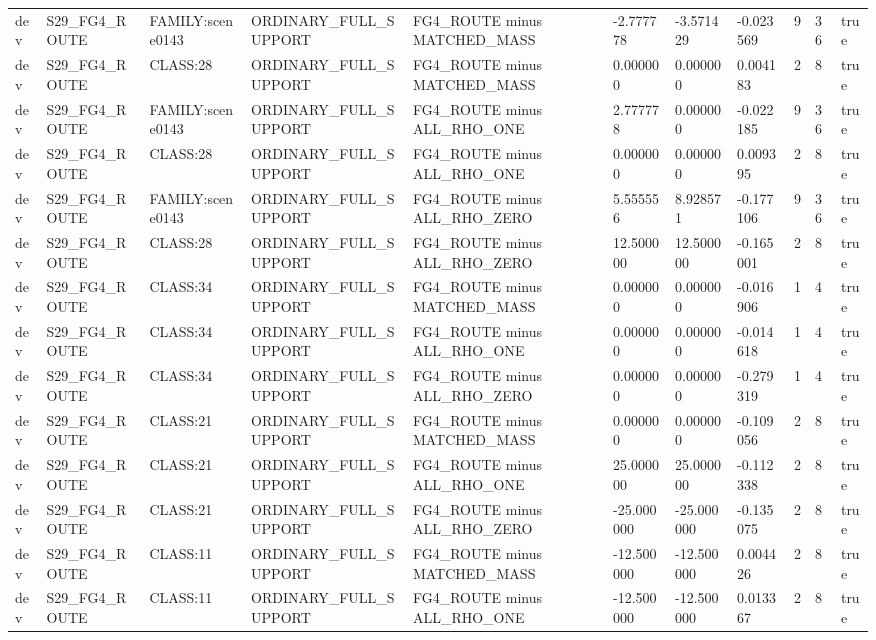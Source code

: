 \begin{tabular}{lllllllllll}
dev & S29\_FG4\_ROUTE & FAMILY:scene0143 & ORDINARY\_FULL\_SUPPORT & FG4\_ROUTE minus MATCHED\_MASS & -2.777778 & -3.571429 & -0.023569 & 9 & 36 & true \\
dev & S29\_FG4\_ROUTE & CLASS:28 & ORDINARY\_FULL\_SUPPORT & FG4\_ROUTE minus MATCHED\_MASS & 0.000000 & 0.000000 & 0.004183 & 2 & 8 & true \\
dev & S29\_FG4\_ROUTE & FAMILY:scene0143 & ORDINARY\_FULL\_SUPPORT & FG4\_ROUTE minus ALL\_RHO\_ONE & 2.777778 & 0.000000 & -0.022185 & 9 & 36 & true \\
dev & S29\_FG4\_ROUTE & CLASS:28 & ORDINARY\_FULL\_SUPPORT & FG4\_ROUTE minus ALL\_RHO\_ONE & 0.000000 & 0.000000 & 0.009395 & 2 & 8 & true \\
dev & S29\_FG4\_ROUTE & FAMILY:scene0143 & ORDINARY\_FULL\_SUPPORT & FG4\_ROUTE minus ALL\_RHO\_ZERO & 5.555556 & 8.928571 & -0.177106 & 9 & 36 & true \\
dev & S29\_FG4\_ROUTE & CLASS:28 & ORDINARY\_FULL\_SUPPORT & FG4\_ROUTE minus ALL\_RHO\_ZERO & 12.500000 & 12.500000 & -0.165001 & 2 & 8 & true \\
dev & S29\_FG4\_ROUTE & CLASS:34 & ORDINARY\_FULL\_SUPPORT & FG4\_ROUTE minus MATCHED\_MASS & 0.000000 & 0.000000 & -0.016906 & 1 & 4 & true \\
dev & S29\_FG4\_ROUTE & CLASS:34 & ORDINARY\_FULL\_SUPPORT & FG4\_ROUTE minus ALL\_RHO\_ONE & 0.000000 & 0.000000 & -0.014618 & 1 & 4 & true \\
dev & S29\_FG4\_ROUTE & CLASS:34 & ORDINARY\_FULL\_SUPPORT & FG4\_ROUTE minus ALL\_RHO\_ZERO & 0.000000 & 0.000000 & -0.279319 & 1 & 4 & true \\
dev & S29\_FG4\_ROUTE & CLASS:21 & ORDINARY\_FULL\_SUPPORT & FG4\_ROUTE minus MATCHED\_MASS & 0.000000 & 0.000000 & -0.109056 & 2 & 8 & true \\
dev & S29\_FG4\_ROUTE & CLASS:21 & ORDINARY\_FULL\_SUPPORT & FG4\_ROUTE minus ALL\_RHO\_ONE & 25.000000 & 25.000000 & -0.112338 & 2 & 8 & true \\
dev & S29\_FG4\_ROUTE & CLASS:21 & ORDINARY\_FULL\_SUPPORT & FG4\_ROUTE minus ALL\_RHO\_ZERO & -25.000000 & -25.000000 & -0.135075 & 2 & 8 & true \\
dev & S29\_FG4\_ROUTE & CLASS:11 & ORDINARY\_FULL\_SUPPORT & FG4\_ROUTE minus MATCHED\_MASS & -12.500000 & -12.500000 & 0.004426 & 2 & 8 & true \\
dev & S29\_FG4\_ROUTE & CLASS:11 & ORDINARY\_FULL\_SUPPORT & FG4\_ROUTE minus ALL\_RHO\_ONE & -12.500000 & -12.500000 & 0.013367 & 2 & 8 & true \\

\end{tabular}
